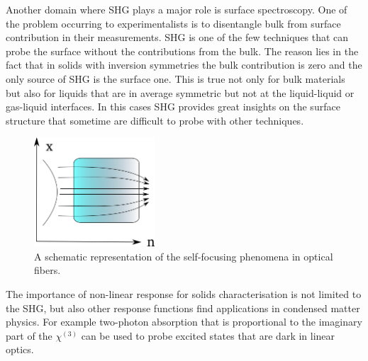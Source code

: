 Another domain where SHG plays a major role is surface spectroscopy. One of the problem occurring to experimentalists is to disentangle bulk from surface contribution in their measurements. SHG is one of the few techniques that can probe the surface without the contributions from the bulk. The reason lies in the fact that in solids with inversion symmetries the bulk contribution is zero and the only source of SHG is the surface one. This is true not only for bulk materials but also for liquids that are in average symmetric but not at the liquid-liquid or gas-liquid interfaces. In  this cases SHG provides  great insights on the surface structure that sometime are difficult to probe with other techniques.\cite{eisenthal1996liquid} \\ 
\begin{figure}
 \vspace{-0.8cm}
\begin{center}
\includegraphics[width=0.4\textwidth]{Figures/selffocus}
\end{center}
\vspace{-0.5cm}
\caption{A schematic representation of the self-focusing phenomena in optical fibers. \label{selffocusing}}
\end{figure}           
The importance of non-linear response for solids characterisation is not limited to the SHG, but also other response functions find applications in condensed matter physics. For example two-photon absorption that is proportional to the imaginary part of the $\chi^{(3)}$ can be used to probe excited states that are dark in linear optics.\cite{wang2005optical,cassabois2015hexagonal}\\ 
